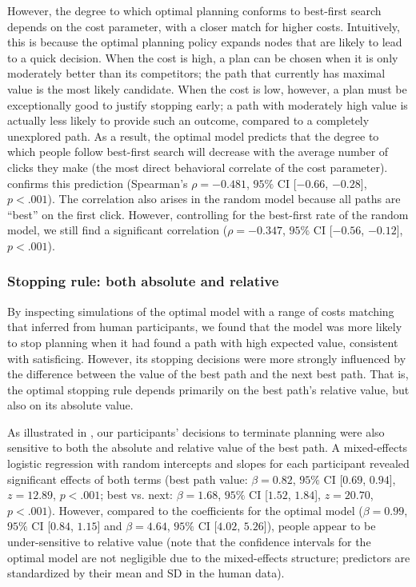 However, the degree to which optimal planning conforms to best-first search depends on the cost parameter, with a closer match for higher costs.
Intuitively, this is because the optimal planning policy expands nodes that are likely to lead to a quick decision. When the cost is high, a plan can be chosen when it is only moderately better than its competitors; the path that currently has maximal value is the most likely candidate. When the cost is low, however, a plan must be exceptionally good to justify stopping early; a path with moderately high value is actually less likely to provide such an outcome, compared to a completely unexplored path.
As a result, the optimal model predicts that the degree to which people follow best-first search will decrease with the average number of clicks they make (the most direct behavioral correlate of the cost parameter).  confirms this prediction (Spearman's $\rho=-0.481$, $95\%$ CI [$-0.66$, $-0.28$], $p < .001$). The correlation also arises in the random model because all paths are ``best'' on the first click. However, controlling for the best-first rate of the random model, we still find a significant correlation ($\rho=-0.347$, $95\%$ CI [$-0.56$, $-0.12$], $p < .001$).

\subsubsection{Stopping rule: both absolute and relative}\label{sec:planning-stopping}
By inspecting simulations of the optimal model with a range of costs matching that inferred from human participants, we found that the model was more likely to stop planning when it had found a path with high expected value, consistent with satisficing. However, its stopping decisions were more strongly influenced by the difference between the value of the best path and the next best path. That is, the optimal stopping rule depends primarily on the best path's relative value, but also on its absolute value.

As illustrated in , our participants' decisions to terminate planning were also sensitive to both the absolute and relative value of the best path. A mixed-effects logistic regression with random intercepts and slopes for each participant revealed significant effects of both terms (best path value: $\beta = 0.82$, $95\%$ CI [$0.69$, $0.94$], $z = 12.89$, $p < .001$; best vs. next: $\beta = 1.68$, $95\%$ CI [$1.52$, $1.84$], $z = 20.70$, $p < .001$). However, compared to the coefficients for the optimal model ($\beta = 0.99$, $95\%$ CI [$0.84$, $1.15$] and $\beta = 4.64$, $95\%$ CI [$4.02$, $5.26$]), people appear to be under-sensitive to relative value (note that the confidence intervals for the optimal model are not negligible due to the mixed-effects structure; predictors are standardized by their mean and SD in the human data).

